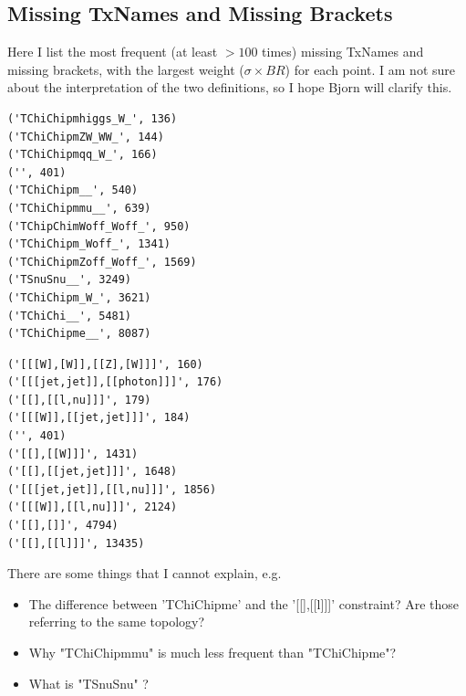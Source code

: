 \documentclass[a4paper,11pt]{article}
\begin{document}
\clearpage
\subsection{Missing TxNames and Missing Brackets}
Here I list the most frequent (at least $> 100$ times) missing TxNames and missing brackets, with the largest weight ($\sigma \times BR$) for each point. I am not sure about the interpretation of the two definitions, so I hope Bjorn will clarify this.

\begin{verbatim}
('TChiChipmhiggs_W_', 136)
('TChiChipmZW_WW_', 144)
('TChiChipmqq_W_', 166)
('', 401)
('TChiChipm__', 540)
('TChiChipmmu__', 639)
('TChipChimWoff_Woff_', 950)
('TChiChipm_Woff_', 1341)
('TChiChipmZoff_Woff_', 1569)
('TSnuSnu__', 3249)
('TChiChipm_W_', 3621)
('TChiChi__', 5481)
('TChiChipme__', 8087)
\end{verbatim}

\begin{verbatim}
('[[[W],[W]],[[Z],[W]]]', 160)
('[[[jet,jet]],[[photon]]]', 176)
('[[],[[l,nu]]]', 179)
('[[[W]],[[jet,jet]]]', 184)
('', 401)
('[[],[[W]]]', 1431)
('[[],[[jet,jet]]]', 1648)
('[[[jet,jet]],[[l,nu]]]', 1856)
('[[[W]],[[l,nu]]]', 2124)
('[[],[]]', 4794)
('[[],[[l]]]', 13435)
\end{verbatim}

There are some things that I cannot explain, e.g.
\begin{itemize}
	\item The difference between 'TChiChipme' and the '[[],[[l]]]' constraint? Are those referring to the same topology? \\
	\item Why "TChiChipmmu" is much less frequent than "TChiChipme"? 
	\item What is "TSnuSnu" ?
\end{itemize}
\end{document}
